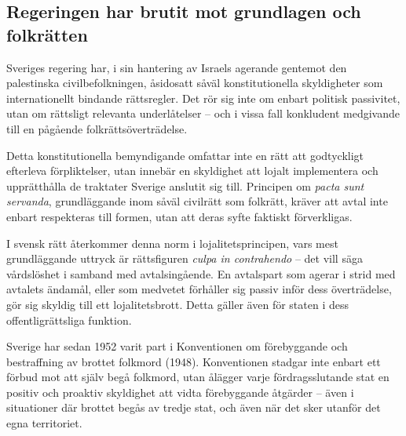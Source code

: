 
\subsection{Regeringen har brutit mot grundlagen och folkrätten}

Sveriges regering har, i sin hantering av Israels agerande gentemot den palestinska civilbefolkningen, åsidosatt såväl konstitutionella skyldigheter som internationellt bindande rättsregler. Det rör sig inte om enbart politisk passivitet, utan om rättsligt relevanta underlåtelser – och i vissa fall konkludent medgivande till en pågående folkrättsöverträdelse.


Detta konstitutionella bemyndigande omfattar inte en rätt att godtyckligt efterleva förpliktelser, utan innebär en skyldighet att lojalt implementera och upprätthålla de traktater Sverige anslutit sig till. Principen om \textit{pacta sunt servanda}, grundläggande inom såväl civilrätt som folkrätt, kräver att avtal inte enbart respekteras till formen, utan att deras syfte faktiskt förverkligas.

I svensk rätt återkommer denna norm i lojalitetsprincipen, vars mest grundläggande uttryck är rättsfiguren \textit{culpa in contrahendo} – det vill säga vårdslöshet i samband med avtalsingående. En avtalspart som agerar i strid med avtalets ändamål, eller som medvetet förhåller sig passiv inför dess överträdelse, gör sig skyldig till ett lojalitetsbrott. Detta gäller även för staten i dess offentligrättsliga funktion.

\medskip

Sverige har sedan 1952 varit part i Konventionen om förebyggande och bestraffning av brottet folkmord (1948). Konventionen stadgar inte enbart ett förbud mot att själv begå folkmord, utan ålägger varje fördragsslutande stat en positiv och proaktiv skyldighet att vidta förebyggande åtgärder – även i situationer där brottet begås av tredje stat, och även när det sker utanför det egna territoriet.


